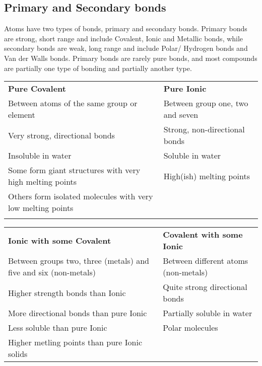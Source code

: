 \documentclass[a4paper, 12pt]{article}
\begin{document}
	\subsection{Primary and Secondary bonds}
		Atoms have two types of bonds, primary and secondary bonds. Primary bonds are strong, short range and include Covalent, Ionic and Metallic bonds, while secondary bonds are weak, long range and include Polar/ Hydrogen bonds and Van der Walls bonds. Primary bonds are rarely pure bonds, and most compounds are partially one type of bonding and partially another type. \\
		\par
		\begin{tabularx}{\textwidth}{X X}
			\textbf{Pure Covalent} & \textbf{Pure Ionic} \\
			Between atoms of the same group or element & Between group one, two and seven \\
			Very strong, directional bonds & Strong, non-directional bonds \\
			Insoluble in water & Soluble in water \\
			Some form giant structures with very high melting points & High(ish) melting points \\
			Others form isolated molecules with very low melting points & \\
			 & \\
		\end{tabularx}
	
		\begin{tabularx}{\textwidth}{X X}
			\textbf{Ionic with some Covalent} & \textbf{Covalent with some Ionic} \\
			Between groups two, three (metals) and five and six (non-metals) & Between different atoms (non-metals) \\
			Higher strength bonds than Ionic & Quite strong directional bonds \\
			More directional bonds than pure Ionic & Partially soluble in water \\
			Less soluble than pure Ionic & Polar molecules \\
			Higher metling points than pure Ionic solids & 
		\end{tabularx}
		

		
\newpage
\end{document}
